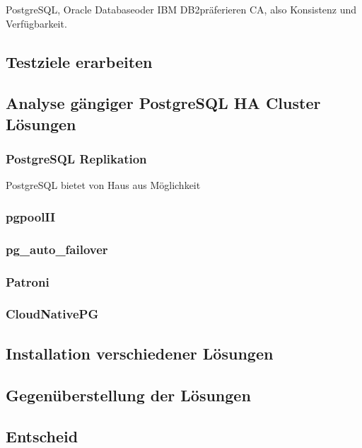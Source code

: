 \Gls{PostgreSQL}, \Gls{Oracle Database}oder \Gls{IBM DB2}präferieren CA, also Konsistenz und Verfügbarkeit.

\subsection{Testziele erarbeiten}
\subsection{Analyse gängiger PostgreSQL HA Cluster Lösungen}
\subsubsection{PostgreSQL Replikation}
PostgreSQL bietet von Haus aus Möglichkeit
\subsubsection{pgpoolII}
\subsubsection{pg\_auto\_failover}
\subsubsection{Patroni}
\subsubsection{CloudNativePG}
\subsection{Installation verschiedener Lösungen}
\subsection{Gegenüberstellung der Lösungen}
\subsection{Entscheid}